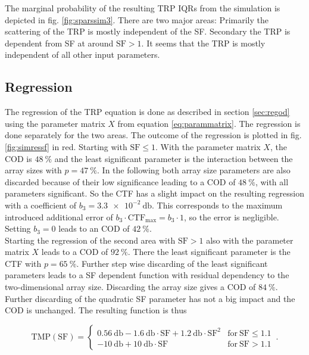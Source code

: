 The marginal probability of the resulting \ac{TRP} \acp{IQR} from the simulation is depicted in fig. \ref{fig:sparssim3}. There are two major areas: Primarily the scattering of the \ac{TRP} is mostly independent of the \ac{SF}. Secondary the \ac{TRP} is dependent from \ac{SF} at around $\text{SF} > 1$. It seems that the \ac{TRP} is mostly independent of all other input parameters.

\subsection{Regression}

The regression of the \ac{TRP} equation is done as described in section \ref{sec:regod} using the parameter matrix $X$ from equation \ref{eq:parammatrix}. The regression is done separately for the two areas. The outcome of the regression is plotted in fig. \ref{fig:simressf} in red.
Starting with $\text{SF}\le 1$. With the parameter matrix $X$, the \ac{COD} is $\SI{48}{\percent}$ and the least significant parameter is the interaction between the array sizes with $p = \SI{47}{\percent}$. In the following both array size parameters are also discarded because of their low significance leading to a \ac{COD} of $\SI{48}{\percent}$, with all parameters significant. So the \ac{CTF} has a slight impact on the resulting regression with a coefficient of $b_3=\SI{3.3e-2}{\decibel}$. This corresponds to the maximum introduced additional error of $b_3\cdot\text{CTF}_\text{max}=b_3\cdot 1$, so the error is negligible. Setting $b_3 = 0$ leads to an \ac{COD} of $\SI{42}{\percent}$.\\
Starting the regression of the second area with $\text{SF} > 1$ also with the parameter matrix $X$ leads to a \ac{COD} of $\SI{92}{\percent}$. There the least significant parameter is the \ac{CTF} with $p = \SI{65}{\percent}$. Further step wise discarding of the least significant parameters leads to a \ac{SF} dependent function with residual dependency to the two-dimensional array size. Discarding the array size gives a \ac{COD} of $\SI{84}{\percent}$. Further discarding of the quadratic \ac{SF} parameter has not a big impact and the \ac{COD} is unchanged. The resulting function is thus

\begin{equation}
\text{TMP}\left(\text{SF}\right)=\begin{cases} 
\SI{0.56}{\decibel}-\SI{1.6}{\decibel}\cdot \text{SF}+\SI{1.2}{\decibel}\cdot\text{SF}^2 & \text{for}\ \text{SF}\le 1.1\\
\SI{-10}{\decibel}+\SI{10}{\decibel}\cdot\text{SF} & \text{for}\ \text{SF}>1.1\end{cases}\,.
\end{equation}

